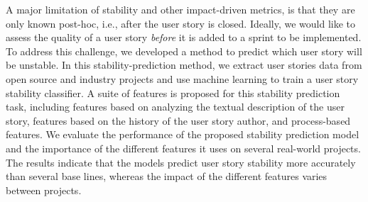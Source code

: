 

A major limitation of stability and other impact-driven metrics, is that they are only known post-hoc, i.e., after the user story is closed. 
Ideally, we would like to assess the quality of a user story \emph{before} it is added to a sprint to be implemented.
To address this challenge, we developed a method to predict which user story will be unstable.
In this stability-prediction method, we extract user stories data from 
open source and industry projects and use machine learning to train a user story stability classifier. 
A suite of features is proposed for this stability prediction task, including features based on analyzing the textual description of the user story, features based on the history of the user story author, and process-based features. 
We evaluate the performance of the proposed stability prediction model and the importance of the different features it uses on several real-world projects. The results indicate that the models predict user story stability more accurately than several base lines, whereas the impact of the different features varies between projects.




